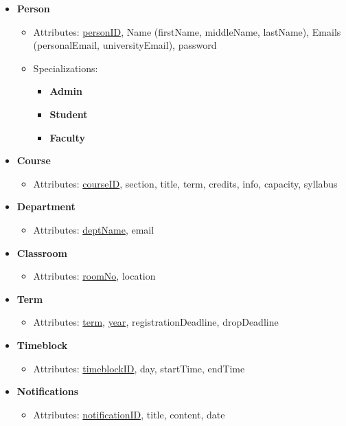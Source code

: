 \documentclass{report}
\begin{document}
\begin{itemize}
    \item \textbf{Person}
    \begin{itemize}
        \item Attributes: \underline{personID}, Name (firstName, middleName, lastName), Emails (personalEmail, universityEmail), password
        \item Specializations:
        \begin{itemize}
            \item \textbf{Admin}
            \item \textbf{Student}
            \item \textbf{Faculty}
        \end{itemize}
    \end{itemize}
    \item \textbf{Course}
    \begin{itemize}
        \item Attributes: \underline{courseID}, section, title, term, credits, info, capacity, syllabus
    \end{itemize}
    \item \textbf{Department}
    \begin{itemize}
        \item Attributes: \underline{deptName}, email
    \end{itemize}
    \item \textbf{Classroom}
    \begin{itemize}
        \item Attributes: \underline{roomNo}, location
    \end{itemize}
    \item \textbf{Term}
    \begin{itemize}
        \item Attributes: \underline{term}, \underline{year}, registrationDeadline, dropDeadline
    \end{itemize}
    \item \textbf{Timeblock}
    \begin{itemize}
        \item Attributes: \underline{timeblockID}, day, startTime, endTime
    \end{itemize}
    \item \textbf{Notifications}
    \begin{itemize}
        \item Attributes: \underline{notificationID}, title, content, date
    \end{itemize}
\end{itemize}
\end{document}
